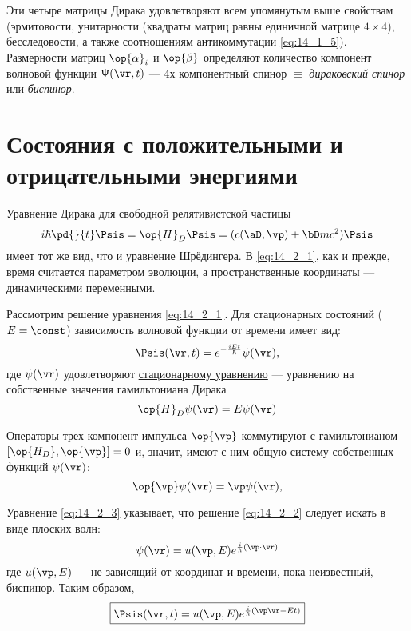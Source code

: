 Эти четыре матрицы Дирака удовлетворяют всем упомянутым выше свойствам (эрмитовости, унитарности (квадраты матриц равны единичной матрице $4 \times 4$), бесследовости, а также соотношениям антикоммутации \eqref{eq:14_1_5}). Размерности матриц $\op{\alpha}_i$ и $\op{\beta}$ определяют количество компонент волновой функции $\mathsf{\Psi}(\vr, t)$ --- 4х компонентный спинор $\equiv$ {\em дираковский спинор} или {\em биспинор}.

\section{Состояния с положительными и отрицательными энергиями}

Уравнение Дирака для свободной релятивистской частицы 
\begin{equation}
\label{eq:14_2_1}
i \hbar \pd{}{t} \Psis = \op{H}_D \Psis = (c(\aD, \vp) + \bD mc^2) \Psis
\end{equation}
имеет тот же вид, что и уравнение Шрёдингера. В \eqref{eq:14_2_1}, как и прежде, время считается параметром эволюции, а пространственные координаты --- динамическими переменными.

Рассмотрим решение уравнения \eqref{eq:14_2_1}. Для стационарных состояний ($E = \const$) зависимость волновой функции от времени имеет вид:
$$
\Psis(\vr, t) = e^{-\frac{i Et}{\hbar}} \psi(\vr),
$$
где $\psi(\vr)$ удовлетворяют \underline{стационарному уравнению} --- уравнению на собственные значения гамильтониана Дирака
\begin{equation}
\label{eq:14_2_2}
\op{H}_D \psi(\vr) = E \psi(\vr)
\end{equation}

Операторы трех компонент импульса $\op{\vp}$ коммутируют с гамильтонианом $[\op{H_D}, \op{\vp}] = 0$ и, значит, имеют с ним общую систему собственных функций $\psi(\vr)$:
\begin{equation}
\label{eq:14_2_3}
\op{\vp} \psi(\vr) = \vp \psi(\vr),
\end{equation}

Уравнение \eqref{eq:14_2_3} указывает, что решение \eqref{eq:14_2_2} следует искать в виде плоских волн:
\begin{equation}
\label{eq:14_2_4}
\psi(\vr) = u(\vp, E) e^{\frac{i}{\hbar}(\vp \cdot \vr)}
\end{equation}
где $u(\vp, E)$ --- не зависящий от координат и времени, пока неизвестный, биспинор. Таким образом,
$$
\boxed{\Psis(\vr, t) = u(\vp, E) e^{\frac{i}{\hbar}(\vp \vr - Et)}}
$$


